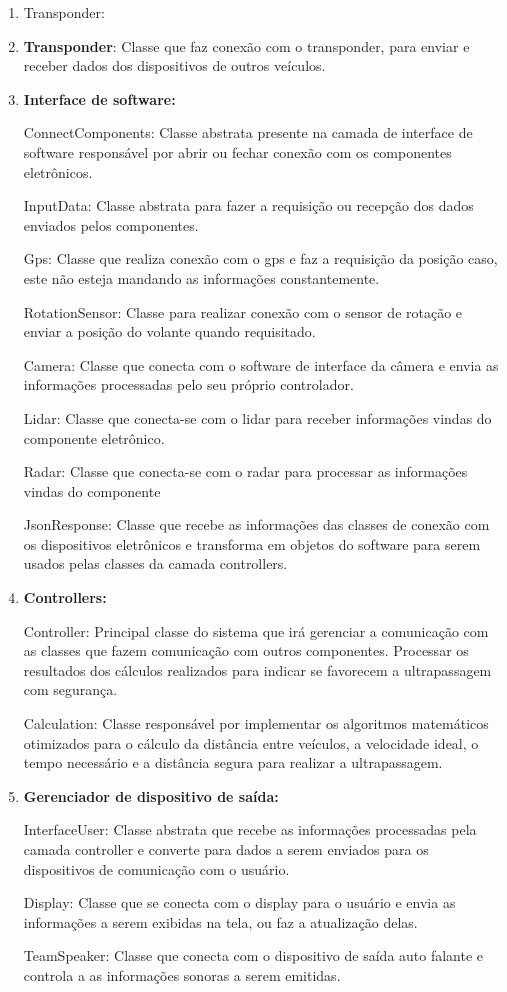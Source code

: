   \begin{enumerate}
  \item Transponder:

  \item  \textbf{Transponder}: Classe que faz conexão com o transponder, para enviar e receber dados dos dispositivos de outros veículos.

\item  \textbf{Interface de software:}

ConnectComponents: Classe abstrata presente na camada de interface de software responsável por abrir ou fechar conexão com os componentes eletrônicos.

InputData: Classe abstrata para fazer a requisição ou recepção dos dados enviados pelos componentes.

Gps: Classe que realiza conexão com o gps e faz a requisição da posição caso, este não esteja mandando as informações constantemente.

RotationSensor: Classe para realizar conexão com o sensor de rotação e enviar a posição do volante quando requisitado.

Camera: Classe que conecta com o software de interface da câmera e envia as informações processadas pelo seu próprio controlador.

Lidar: Classe que conecta-se com o lidar para receber informações vindas do componente eletrônico.

Radar: Classe que conecta-se com o radar para processar as informações vindas do componente

JsonResponse: Classe que recebe as informações das classes de conexão com os dispositivos eletrônicos e transforma em objetos do software para serem usados pelas classes da camada controllers.

\item   \textbf{Controllers:}

Controller: Principal classe do sistema que irá gerenciar a comunicação com as classes que fazem comunicação com outros componentes. Processar os resultados dos cálculos realizados para indicar se favorecem a ultrapassagem com segurança.

Calculation: Classe responsável por implementar os algoritmos matemáticos otimizados para o cálculo da distância entre veículos, a velocidade ideal, o tempo necessário e a distância segura para realizar a ultrapassagem.


\item   \textbf{Gerenciador de dispositivo de saída:}

InterfaceUser: Classe abstrata que recebe as informações processadas pela camada controller e converte para dados a serem enviados para os dispositivos de comunicação com o usuário.

Display: Classe que se conecta com o display para o usuário e envia as informações a serem exibidas na tela, ou faz a atualização delas.

TeamSpeaker: Classe que conecta com o dispositivo de saída auto falante e controla a as informações sonoras a serem emitidas.




\end{enumerate}
